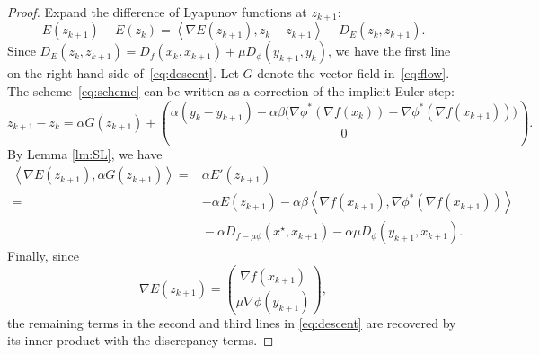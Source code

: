 \documentclass{article}
\newcommand{\dual}[1]{\left\langle {#1} \right\rangle}
\theoremstyle{plain}
\theoremstyle{definition}
\theoremstyle{remark}
\begin{document}
\begin{proof}
Expand the difference of Lyapunov functions at $z_{k+1}$:
$$
E(z_{k+1})-E(z_k) = \dual{\nabla E(z_{k+1}),z_k-z_{k+1}} -D_E(z_k,z_{k+1}).
$$
Since $D_E(z_k,z_{k+1})=D_f(x_k,x_{k+1})+\mu D_\phi(y_{k+1},y_k)$, we have the first line on the right-hand side of~\eqref{eq:descent}.
Let $G$ denote the vector field in~\eqref{eq:flow}. The scheme~\eqref{eq:scheme} can be written as a correction of the implicit Euler step:
$$z_{k+1}-z_k=\alpha G(z_{k+1})+\binom{\alpha(y_k-y_{k+1})-\alpha\beta\bigl(\nabla\phi^*(\nabla f(x_k))-\nabla\phi^*(\nabla f(x_{k+1}))\bigr)}{0}.$$
By Lemma \ref{lm:SL}, we have
$$
\begin{aligned}
\dual{\nabla E(z_{k+1}), \alpha G(z_{k+1})} ={}& \alpha E'(z_{k+1})\\={}&-\alpha E(z_{k+1}) - \alpha\beta\dual{\nabla f(x_{k+1}),\nabla\phi^*(\nabla f(x_{k+1}))}\\
&{} - \alpha D_{f-\mu\phi}(x^\star,x_{k+1}) - \alpha\mu D_\phi(y_{k+1},x_{k+1}).
\end{aligned}
$$
Finally, since $$\nabla E(z_{k+1})=\binom{\nabla f(x_{k+1})}{\mu\nabla\phi(y_{k+1})},$$ the remaining terms in the second and third lines in \eqref{eq:descent} are recovered by its inner product with the discrepancy terms. 
%
%
\end{proof}





% 
\end{document}
